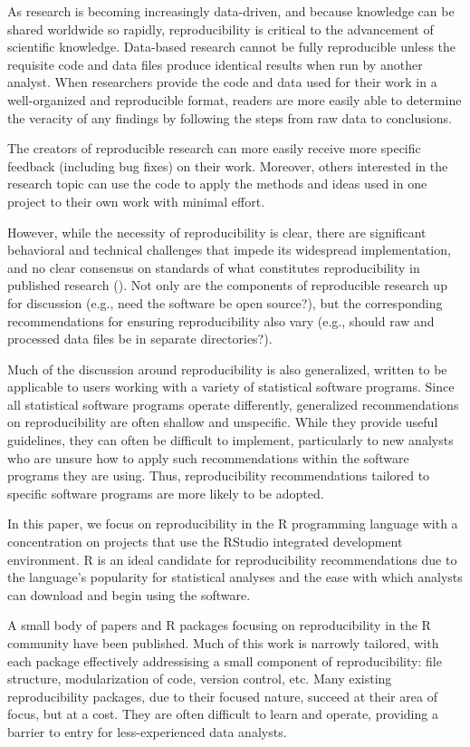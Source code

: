 \documentclass[APA,LATO1COL]{WileyNJD-v2}
\begin{document}
As research is becoming increasingly data-driven, and because knowledge can be shared worldwide so rapidly, reproducibility is critical to the advancement of scientific knowledge. 
Data-based research cannot be fully reproducible unless the requisite code and data files
produce identical results when run by another analyst. When researchers provide the code and data used for their work in a well-organized and reproducible format, readers are more easily able to determine the veracity of any findings by following the steps from raw data to conclusions.

The creators of reproducible research can more easily receive more specific feedback (including bug fixes) on their work. Moreover, others interested in the research topic can use the code to apply the methods and ideas used in one project to their own work with minimal effort.

However, while the necessity of reproducibility is clear, there are significant behavioral and technical challenges that impede its widespread implementation, and no clear consensus on standards of what constitutes reproducibility in published research (\cite{peng2009bio}). Not only are the components of reproducible research up for discussion (e.g., need the software be open source?), but the corresponding recommendations for ensuring reproducibility also vary (e.g., should raw and processed data files be in separate directories?).

Much of the discussion around reproducibility is also generalized, written to be applicable to users working with a variety of statistical software programs. Since all statistical software programs operate differently, generalized recommendations on reproducibility are often shallow and unspecific. While they provide useful guidelines, they can often be difficult to implement, particularly to new analysts who are unsure how to apply such recommendations within the software programs they are using. Thus, reproducibility recommendations tailored to specific software programs are more likely to be adopted.

In this paper, we focus on reproducibility in the R programming language with a concentration on projects that use the RStudio integrated development environment. R is an ideal candidate for reproducibility recommendations due to the language's popularity for statistical analyses and the ease with which analysts can download and begin using the software.

A small body of papers and R packages focusing on reproducibility in the R community have been published. Much of this work is narrowly tailored, with each package effectively addressising a small component of reproducibility: file structure, modularization of code, version control, etc. Many existing reproducibility packages, due to their focused nature, succeed at their area of focus, but at a cost. They are often difficult to learn and operate, providing a barrier to entry for less-experienced data analysts.
\end{document}
